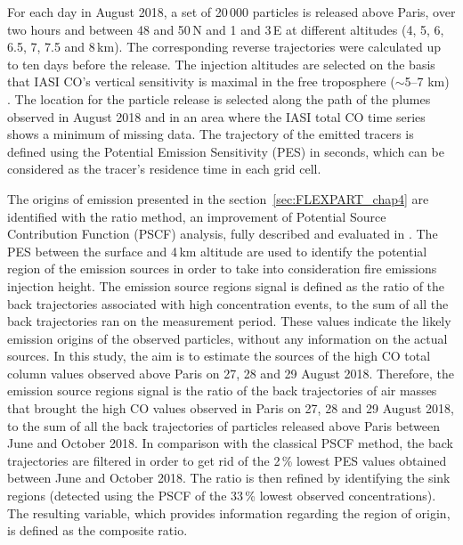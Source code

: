 \documentclass[acp, manuscript]{copernicus}
\begin{document}
For each day in August 2018, a set of 20\,000 particles is released above Paris, over two hours and between 48 and 50\,\textdegree N and 1 and 3\,\textdegree E at different altitudes (4, 5, 6, 6.5, 7, 7.5 and 8\,km). The corresponding reverse trajectories were calculated up to ten days before the release. The injection altitudes are selected on the basis that IASI CO's vertical sensitivity is maximal in the free troposphere ($\sim$5--7 km) \citep{clerbauxMonitoringAtmosphericComposition2009a}. The location for the particle release is selected along the path of the plumes observed in August 2018 and in an area where the IASI total CO time series shows a minimum of missing data. The trajectory of the emitted tracers is defined using the Potential Emission Sensitivity (PES) in seconds, which can be considered as the tracer's residence time in each grid cell.


The origins of emission presented in the section~\ref{sec:FLEXPART_chap4} are identified with the ratio method, an improvement of Potential Source Contribution Function (PSCF) analysis, fully described and evaluated in \citet{dasilvaHowTraceOrigins2025}. The PES between the surface and 4\,km altitude are used to identify the potential region of the emission sources in order to take into consideration fire emissions injection height. 
The emission source regions signal is defined as the ratio of the back trajectories associated with high concentration events, to the sum of all the back trajectories ran on the measurement period. These values indicate the likely emission origins of the observed particles, without any information on the actual sources. In this study, the aim is to estimate the sources of the high CO total column values observed above Paris on 27, 28 and 29 August 2018. Therefore, the emission source regions signal is the ratio of the back trajectories of air masses that brought the high CO values observed in Paris on 27, 28 and 29 August 2018, to the sum of all the back trajectories of particles released above Paris between June and October 2018. 
In comparison with the classical PSCF method, the back trajectories are filtered in order to get rid of the 2\,\% lowest PES values obtained between June and October 2018. The ratio is then refined by identifying the sink regions (detected using the PSCF of the 33\,\% lowest observed concentrations). The resulting variable, which provides information regarding the region of origin, is defined as the composite ratio. 


\end{document}

